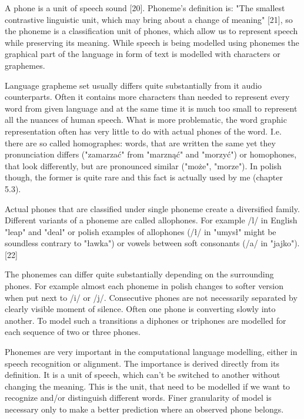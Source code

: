\documentclass[12pt,a4paper,english]{article}
\begin{document}
A phone is a unit of speech sound [20]. Phoneme's definition is: "The smallest contrastive linguistic unit, which may bring about a change of meaning" [21], so the phoneme is a classification unit of phones, which allow us to represent speech while preserving its meaning.  While speech is being modelled using phonemes the graphical part of the language in form of text is modelled with characters or graphemes. \newline

Language grapheme set usually differs quite substantially from it audio counterparts. Often it contains more characters than needed to represent every word from given language and at the same time it is much too small to represent all the nuances of human speech. What is more problematic, the word graphic representation often has very little to do with actual phones of the word. I.e. there are so called homographes: words, that are written the same yet they pronunciation differs ("zamarzać" from "marznąć" and "morzyć") or homophones, that look differently, but are pronounced similar ("może", "morze"). In polish though, the former is quite rare and this fact is actually used by me (chapter 5.3). \newline


Actual phones that are classified under single phoneme create a diversified family.  Different variants of a phoneme are called allophones. For example /l/ in English "leap" and "deal" or polish examples of allophones (/ł/ in "umysł" might be soundless contrary to "ławka") or vowels between soft consonants (/a/ in "jajko"). [22] \newline

The phonemes can differ quite substantially depending on the surrounding phones. For example almost each phoneme in polish changes to softer version when put next to /i/ or /j/. Consecutive phones are not necessarily separated by clearly visible moment of silence. Often one phone is converting slowly into another. To model such a transitions a diphones or triphones are modelled for each sequence of two or three phones. \newline

Phonemes are very important in the computational language modelling, either in speech recognition or alignment. The importance is derived directly from its definition. It is a unit of speech, which can't be switched to another without changing the meaning. This is the unit, that need to be modelled if we want to recognize and/or distinguish different words. Finer granularity of model is necessary only to make a better prediction where an observed phone belongs.
\end{document}
